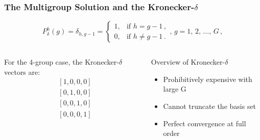 \documentclass[fleqn]{beamer}
\begin{document}
    \begin{frame}
        \frametitle{The Multigroup Solution and the Kronecker-$\delta$}
        \begin{equation*}
            P_{\delta}^h(g) = \delta_{h, g-1} =
            \begin{cases}
                1, & \text{if }  h = g-1 \, , \\
                0, & \text{if }  h \neq g-1 \, .
            \end{cases}
            ,\, g=1,\, 2, \, \ldots,\, G \, ,
        \end{equation*}
        \begin{columns}[T]
            \begin{column}{0.5\textwidth}
                For the 4-group case, the Kronecker-$\delta$ vectors are:
                \begin{equation*}
                    \begin{align}
                        &[1,0,0,0] \\
                        &[0,1,0,0] \\
                        &[0,0,1,0] \\
                        &[0,0,0,1]
                    \end{align}
                \end{equation*}
            \end{column}
            \begin{column}{0.5\textwidth}
                \begin{block}{Overview of Kronecker-$\delta$}
                    \begin{itemize}
                        \item Prohibitively expensive with large G
                        \item Cannot truncate the basis set
                        \item Perfect convergence at full order
                    \end{itemize}
                \end{block}
            \end{column}
        \end{columns}
    \end{frame}
\end{document}
